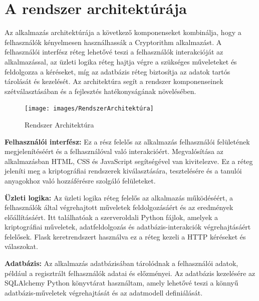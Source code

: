 \newpage
\section{A rendszer architektúrája}
Az alkalmazás architektúrája a következő komponenseket kombinálja, hogy a felhasználók kényelmesen használhassák a Cryptorithm alkalmazást. A felhasználói interfész réteg lehetővé teszi a felhasználók interakcióját az alkalmazással, az üzleti logika réteg hajtja végre a szükséges műveleteket és feldolgozza a kéréseket, míg az adatbázis réteg biztosítja az adatok tartós tárolását és kezelését. Az architektúra segít a rendszer komponenseinek szétválasztásában és a fejlesztés hatékonyságának növelésében.

\begin{figure}[!h]
	\centering
	\texttt{[image: images/RendszerArchitektúra]}
	\caption{Rendszer Architektúra}
\end{figure}

\textbf{Felhasználói interfész:} Ez a rész felelős az alkalmazás felhasználói felületének megjelenítéséért és a felhasználóval való interakcióért. Megvalósítása az alkalmazásban HTML, CSS és JavaScript segítségével van kivitelezve. Ez a réteg jeleníti meg a kriptográfiai rendszerek kiválasztására, tesztelésére és a tanulói anyagokhoz való hozzáférésre szolgáló felületeket.

\textbf{Üzleti logika:} Az üzleti logika réteg felelős az alkalmazás működéséért, a felhasználók által végrehajtott műveletek feldolgozásáért és az eredmények előállításáért. Itt találhatóak a szerveroldali Python fájlok, amelyek a kriptográfiai műveletek, adatfeldolgozás és adatbázis-interakciók végrehajtásáért felelősek. Flask keretrendszert használva ez a réteg kezeli a HTTP kéréseket és válaszokat.

\textbf{Adatbázis:} Az alkalmazás adatbázisában tárolódnak a felhasználói adatok, például a regisztrált felhasználók adatai és előzményei. Az adatbázis kezelésére az SQLAlchemy Python könyvtárat használtam, amely lehetővé teszi a könnyű adatbázis-műveletek végrehajtását és az adatmodell definiálását.


